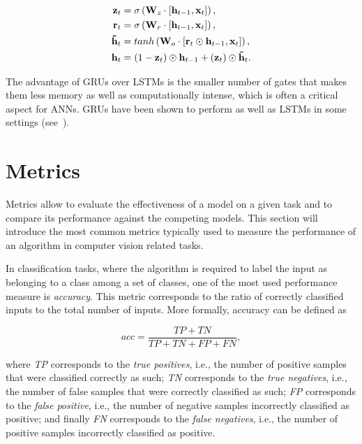 \begin{equation}\label{eq:GRU}
\begin{split}
    \mathbf{z}_t &= \sigma \left( \mathbf{W}_z \cdot \left[\mathbf{h}_{t-1},
        \mathbf{x}_t\right]\right), \\
    \mathbf{r}_t &= \sigma \left( \mathbf{W}_r \cdot \left[\mathbf{h}_{t-1},
        \mathbf{x}_t\right]\right), \\
    \mathbf{\tilde h}_t &= tanh \left(\mathbf{W}_o \cdot \left[\mathbf{r}_t
        \odot \mathbf{h}_{t-1}, \mathbf{x}_t\right]
        \right), \\
    \mathbf{h}_t &= (1-\mathbf{z}_t) \odot \mathbf{h}_{t-1} +
        (\mathbf{z}_t) \odot \mathbf{\tilde h}_t.
\end{split}
\end{equation}

The advantage of GRUs over LSTMs is the smaller number of gates that makes them
less memory as well as computationally intense, which is often a critical
aspect for ANNs. GRUs have been shown to perform as well as LSTMs in some
settings (see~\citep{Chung-et-al-NIPSDL2014-small}).

\section{Metrics}
Metrics allow to evaluate the effectiveness of a model on a given task and to
compare its performance against the competing models. This section will
introduce the most common metrics typically used to measure the performance of
an algorithm in computer vision related tasks.

In classification tasks, where the algorithm is required to label the input as
belonging to a class among a set of classes, one of the most used performance
measure is \emph{accuracy}. This metric corresponds to the ratio of correctly
classified inputs to the total number of inputs. More formally, accuracy can be
defined as

\begin{equation}\label{eq:accuracy}
    acc = \frac{TP + TN}{TP + TN + FP + FN},
\end{equation}

\noindent where \emph{TP} corresponds to the \emph{true positives}, i.e., the
number of positive samples that were classified correctly as such; \emph{TN}
corresponds to the \emph{true negatives}, i.e., the number of false samples
that were correctly classified as such; \emph{FP} corresponds to the
\emph{false positive}, i.e., the number of negative samples incorrectly
classified as positive; and finally \emph{FN} corresponds to the \emph{false
negatives}, i.e., the number of positive samples incorrectly classified as
positive.

